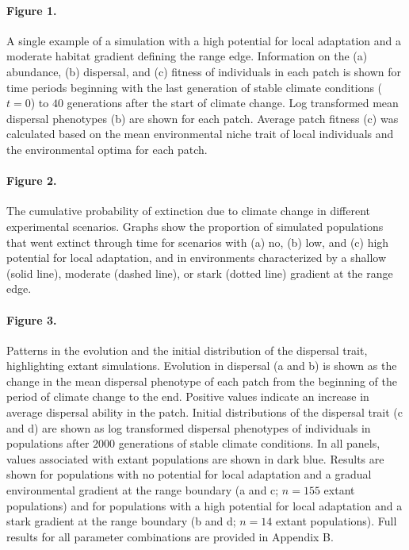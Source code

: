 \documentclass[12pt, oneside]{article}
\begin{document}
\paragraph{Figure 1.} A single example of a simulation with a high potential for local adaptation and a moderate habitat gradient defining the range edge. Information on the (a) abundance, (b) dispersal, and (c) fitness of individuals in each patch is shown for time periods beginning with the last generation of stable climate conditions ($t = 0$) to $40$ generations after the start of climate change. Log transformed mean dispersal phenotypes (b) are shown for each patch. Average patch fitness (c) was calculated based on the mean environmental niche trait of local individuals and the environmental optima for each patch.

\paragraph{Figure 2.} The cumulative probability of extinction due to climate change in different experimental scenarios. Graphs show the proportion of simulated populations that went extinct through time for scenarios with (a) no, (b) low, and (c) high potential for local adaptation, and in environments characterized by a shallow (solid line), moderate (dashed line), or stark (dotted line) gradient at the range edge.

\paragraph{Figure 3.} Patterns in the evolution and the initial distribution of the dispersal trait, highlighting extant simulations. Evolution in dispersal (a and b) is shown as the change in the mean dispersal phenotype of each patch from the beginning of the period of climate change to the end. Positive values indicate an increase in average dispersal ability in the patch. Initial distributions of the dispersal trait (c and d) are shown as log transformed dispersal phenotypes of individuals in populations after $2000$ generations of stable climate conditions. In all panels, values associated with extant populations are shown in dark blue. Results are shown for populations with no potential for local adaptation and a gradual environmental gradient at the range boundary (a and c; $n = 155$ extant populations) and for populations with a high potential for local adaptation and a stark gradient at the range boundary (b and d; $n = 14$ extant populations). Full results for all parameter combinations are provided in Appendix B.
\end{document}
